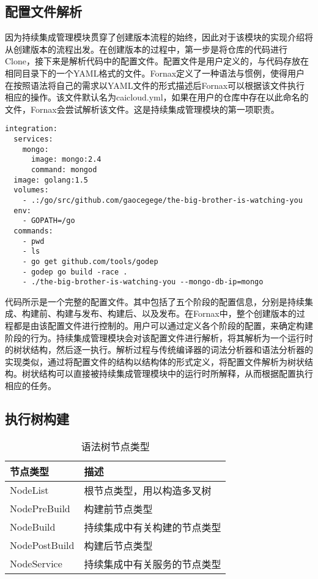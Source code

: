 \subsection{配置文件解析}

因为持续集成管理模块贯穿了创建版本流程的始终，因此对于该模块的实现介绍将从创建版本的流程出发。在创建版本的过程中，第一步是将仓库的代码进行Clone，接下来是解析代码中的配置文件。配置文件是用户定义的，与代码存放在相同目录下的一个YAML格式的文件。Fornax定义了一种语法与惯例，使得用户在按照语法将自己的需求以YAML文件的形式描述后Fornax可以根据该文件执行相应的操作。该文件默认名为caicloud.yml，如果在用户的仓库中存在以此命名的文件，Fornax会尝试解析该文件。这是持续集成管理模块的第一项职责。

\begin{lstlisting}[caption={配置文件实例}]
integration:
  services:
    mongo:
      image: mongo:2.4
      command: mongod
  image: golang:1.5
  volumes:
    - .:/go/src/github.com/gaocegege/the-big-brother-is-watching-you
  env:
    - GOPATH=/go
  commands:
    - pwd
    - ls
    - go get github.com/tools/godep
    - godep go build -race .
    - ./the-big-brother-is-watching-you --mongo-db-ip=mongo
\end{lstlisting}

代码所示是一个完整的配置文件。其中包括了五个阶段的配置信息，分别是持续集成、构建前、构建与发布、构建后、以及发布。在Fornax中，整个创建版本的过程都是由该配置文件进行控制的。用户可以通过定义各个阶段的配置，来确定构建阶段的行为。持续集成管理模块会对该配置文件进行解析，将其解析为一个运行时的树状结构，然后逐一执行。解析过程与传统编译器的词法分析器和语法分析器的实现类似，通过将配置文件的结构以结构体的形式定义，将配置文件解析为树状结构。树状结构可以直接被持续集成管理模块中的运行时所解释，从而根据配置执行相应的任务。

\subsection{执行树构建}

\begin{table}[!hpb]
  \centering
  \caption{语法树节点类型}
  \label{tab:nodetype}
  \begin{tabular}{ll} \toprule
    节点类型 & 描述 \\ \midrule
    NodeList & 根节点类型，用以构造多叉树 \\
    NodePreBuild & 构建前节点类型  \\
    NodeBuild & 持续集成中有关构建的节点类型  \\
    NodePostBuild & 构建后节点类型 \\
    NodeService & 持续集成中有关服务的节点类型  \\ \bottomrule
  \end{tabular}
\end{table}

